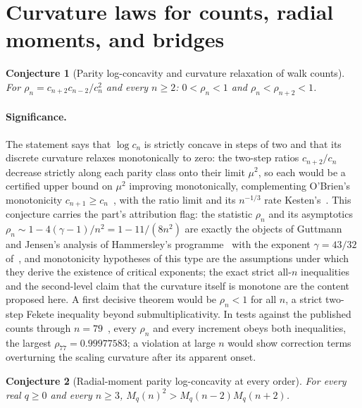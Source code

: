 \documentclass[11pt]{article}
\newtheorem{conjecture}{Conjecture}
\theoremstyle{definition}
\begin{document}
\section{Curvature laws for counts, radial moments, and bridges}

\begin{conjecture}[Parity log-concavity and curvature relaxation of walk counts]\label{af1}
For $\rho_n=c_{n+2}c_{n-2}/c_n^2$ and every $n\ge2$: $0<\rho_n<1$ and $\rho_n<\rho_{n+2}<1$.
\end{conjecture}

\paragraph{Significance.}
The statement says that $\log c_n$ is strictly concave in steps of two and that its discrete curvature relaxes monotonically to zero: the two-step ratios $c_{n+2}/c_n$ decrease strictly along each parity class onto their limit $\mu^2$, so each would be a certified upper bound on $\mu^2$ improving monotonically, complementing O'Brien's monotonicity $c_{n+1}\ge c_n$~\cite{OBr90}, with the ratio limit and its $n^{-1/3}$ rate Kesten's~\cite{Kes63}.  This conjecture carries the part's attribution flag: the statistic $\rho_n$ and its asymptotics $\rho_n\sim1-4(\gamma-1)/n^2=1-11/(8n^2)$ are exactly the objects of Guttmann and Jensen's analysis of Hammersley's programme~\cite{GJ22} with the exponent $\gamma=43/32$ of~\cite{Nie82}, and monotonicity hypotheses of this type are the assumptions under which they derive the existence of critical exponents; the exact strict all-$n$ inequalities and the second-level claim that the curvature itself is monotone are the content proposed here.  A first decisive theorem would be $\rho_n<1$ for all $n$, a strict two-step Fekete inequality beyond submultiplicativity.  In tests against the published counts through $n=79$~\cite{Jen13}, every $\rho_n$ and every increment obeys both inequalities, the largest $\rho_{77}=0.99977583$; a violation at large $n$ would show correction terms overturning the scaling curvature after its apparent onset.

\begin{conjecture}[Radial-moment parity log-concavity at every order]\label{af2}
For every real $q\ge0$ and every $n\ge3$, $M_q(n)^2>M_q(n-2)M_q(n+2)$.
\end{conjecture}
\end{document}
